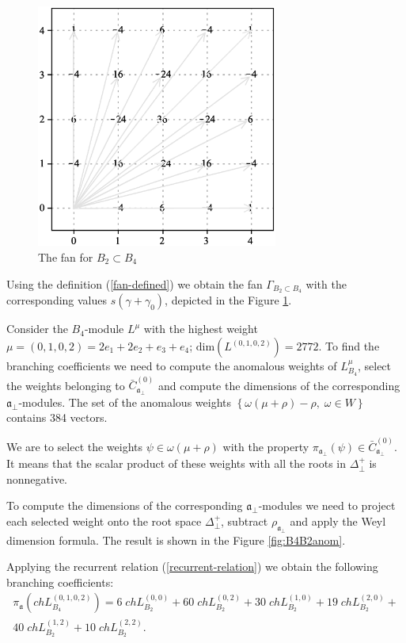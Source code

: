 \documentclass[12pt]{iopart}
\theoremstyle{definition}
\theoremstyle{definition}
\theoremstyle{definition}
\begin{document}
\begin{figure}[b]
  \centering
  \includegraphics[height=80mm]{figure5.eps}
  \caption{The fan for $B_2\subset B_4$}
  \label{fig:B4B2Fan}
\end{figure}
Using the definition (\ref{fan-defined}) we obtain the fan
$\Gamma_{B_2\subset B_4}$ with the corresponding values $s(\gamma+\gamma_0)$,
depicted in the Figure \ref{fig:B4B2Fan}.


Consider the $B_4$-module $L^{\mu}$ with the highest weight $\mu=(0,1,0,2)=2
e_1 + 2 e_2 + e_3 + e_4$; $\mathrm{dim}(L^{(0,1,0,2)})=2772$.
To find the branching coefficients we need to compute the anomalous weights of
$L^{\mu}_{B_4}$, select the weights belonging to $\bar{C}^{\left( 0 \right)}_{\mathfrak{a}_{\bot}}$
and compute the dimensions of the corresponding $\mathfrak{a}_{\bot}$-modules.
The set of the anomalous weights $\left\{ \omega(\mu+\rho)-\rho,\; \omega\in W\right\}$
contains 384 vectors.

We are to select the weights $\psi \in \omega(\mu+\rho)$  with the property
$\pi_{\mathfrak{a}_{\bot}} \left(  \psi \right) \in \bar{C}^{\left( 0 \right)}_{\mathfrak{a}_{\bot}}$.
It means that the scalar product of these weights with all the roots in $\Delta^{+}_{\bot}$ is nonnegative.

To compute the dimensions of the corresponding
$\mathfrak{a}_{\bot}$-modules we need to project each selected weight
onto the root space $\Delta^{+}_{\bot}$, subtract
$\rho_{\mathfrak{a}_{\bot}}$ and apply the Weyl dimension formula. The result is shown in the Figure \ref{fig:B4B2anom}.

Applying the recurrent relation (\ref{recurrent-relation}) we obtain the
following branching coefficients:
\begin{eqnarray*}
  \label{eq:24}
  \pi_{\mathfrak{a}} \left(ch L^{(0,1,0,2)}_{B_4}\right) = 6 \; ch L^{(0,0)}_{B_2}+ 60
  \; ch L_{B_2}^{(0,2)}+ 30 \; ch L_{B_2}^{(1,0)}+ 19 \; ch L_{B_2}^{(2,0)}+\\
  40 \; ch L_{B_2}^{(1,2)}+ 10 \; ch L_{B_2}^{(2,2)}.
\end{eqnarray*}
\end{document}

